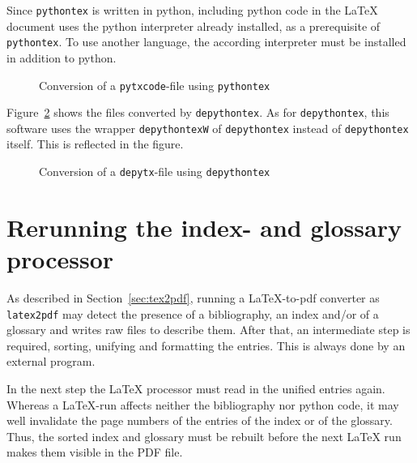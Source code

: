 Since \texttt{pythontex} is written in python, 
including python code in the \LaTeX{} document 
uses the python interpreter already installed, as a prerequisite of \texttt{pythontex}. 
To use another language, the according interpreter must be installed in addition to python. 







\begin{figure}[!htb]
  \centering
  \caption{\label{fig:py2dir}Conversion of a \texttt{pytxcode}-file using \texttt{pythontex}}
  \end{figure}


  Figure~\ref{fig:depy2out} shows the files converted by \texttt{depythontex}. 
  As for \texttt{depythontex}, this software uses the wrapper \texttt{depythontexW} 
  of \texttt{depythontex} instead of \texttt{depythontex} itself. 
  This is reflected in the figure. 


  \begin{figure}[!htb]
    \centering
    \caption{\label{fig:depy2out}Conversion of a \texttt{depytx}-file using \texttt{depythontex}}
    \end{figure}
  
\section{Rerunning the index- and glossary processor}%
\label{sec:rerunMakeIndexGlossaries}

As described in Section~\ref{sec:tex2pdf}, 
running a \LaTeX-to-pdf converter as \texttt{latex2pdf} 
may detect the presence of a bibliography, an index and/or of a glossary 
and writes raw files to describe them. 
After that, an intermediate step is required, 
sorting, unifying and formatting the entries. 
This is always done by an external program. 

In the next step the \LaTeX{} processor must read in the unified entries again. 
Whereas a \LaTeX-run affects neither the bibliography nor python code, 
it may well invalidate the page numbers 
of the entries of the index or of the glossary. 
Thus, the sorted index and glossary must be rebuilt 
before the next \LaTeX{} run makes them visible in the PDF file. 

